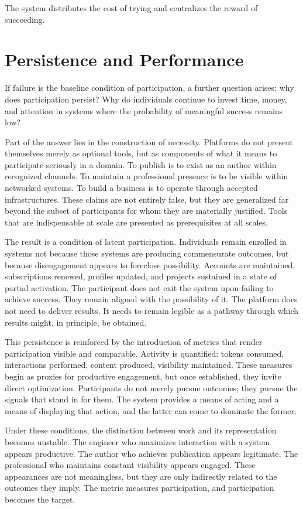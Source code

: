 \documentclass[12pt, a4paper]{article}
\begin{document}
The system distributes the cost of trying and centralizes the reward of succeeding.

\section{Persistence and Performance}

If failure is the baseline condition of participation, a further question arises: why does participation persist? Why do individuals continue to invest time, money, and attention in systems where the probability of meaningful success remains low?

Part of the answer lies in the construction of necessity. Platforms do not present themselves merely as optional tools, but as components of what it means to participate seriously in a domain. To publish is to exist as an author within recognized channels. To maintain a professional presence is to be visible within networked systems. To build a business is to operate through accepted infrastructures. These claims are not entirely false, but they are generalized far beyond the subset of participants for whom they are materially justified. Tools that are indispensable at scale are presented as prerequisites at all scales.

The result is a condition of latent participation. Individuals remain enrolled in systems not because those systems are producing commensurate outcomes, but because disengagement appears to foreclose possibility. Accounts are maintained, subscriptions renewed, profiles updated, and projects sustained in a state of partial activation. The participant does not exit the system upon failing to achieve success. They remain aligned with the possibility of it. The platform does not need to deliver results. It needs to remain legible as a pathway through which results might, in principle, be obtained.

This persistence is reinforced by the introduction of metrics that render participation visible and comparable. Activity is quantified: tokens consumed, interactions performed, content produced, visibility maintained. These measures begin as proxies for productive engagement, but once established, they invite direct optimization. Participants do not merely pursue outcomes; they pursue the signals that stand in for them. The system provides a means of acting and a means of displaying that action, and the latter can come to dominate the former.

Under these conditions, the distinction between work and its representation becomes unstable. The engineer who maximizes interaction with a system appears productive. The author who achieves publication appears legitimate. The professional who maintains constant visibility appears engaged. These appearances are not meaningless, but they are only indirectly related to the outcomes they imply. The metric measures participation, and participation becomes the target.
\end{document}
